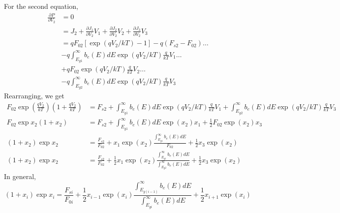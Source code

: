 \documentclass[12pt]{article}
\begin{document}
For the second equation, 
\begin{equation}
\begin{aligned}
\frac{\partial P}{\partial V_2} &= 0 \\
&= J_2 + \frac{\partial J_1}{\partial V_2} V_1 + \frac{\partial J_2}{\partial V_2} V_2 + \frac{\partial J_3}{\partial V_2} V_3 \\
&= q F_{02} \left [ \exp (q V_2/ k T) - 1 \right ] - q (F_{s2} - F_{02})  \ldots \\
&- q \int_{E_{g1}}^{\infty} b_e(E) dE \exp (q V_2/ k T) \frac{q}{k T} V_1 \ldots \\
&+  q F_{02} \exp (q V_2/ k T) \frac{q}{k T} V_2  \ldots \\
& -q  \int_{E_{g2}}^{\infty} b_e(E) dE \exp (q V_{2}/ k T) \frac{q}{k T} V_3  
\end{aligned}
\end{equation}
Rearranging, we get
\begin{equation}
\begin{aligned}
F_{02} \exp (\frac{ q V_2}{ k T} ) \left ( 1 + \frac{ q V_2}{k T} \right ) & = F_{s2} + 
\int_{E_{g1}}^{\infty} b_e(E) dE \exp (q V_2/ k T) \frac{q}{k T} V_1 + 
\int_{E_{g2}}^{\infty} b_e(E) dE \exp (q V_{2}/ k T) \frac{q}{k T} V_3 \\
F_{02} \exp x_2 \left ( 1 + x_2 \right ) & = F_{s2} + 
\int_{E_{g1}}^{\infty} b_e(E) dE \exp (x_2) x_1 + 
\frac{1}{2} F_{02} \exp (x_2) x_3  \\
\left ( 1 + x_2 \right )  \exp x_2  & = \frac{F_{s2}}{F_{02}} + 
x_1 \exp (x_2)  \frac{\int_{E_{g1}}^{\infty} b_e(E) dE}{F_{02}}   + 
\frac{1}{2} x_3 \exp (x_2)   \\
\left ( 1 + x_2 \right )  \exp x_2  & = \frac{F_{s2}}{F_{02}} + 
\frac{1}{2} x_1 \exp (x_2)  \frac{\int_{E_{g1}}^{\infty} b_e(E) dE}{\int_{E_{g2}}^{\infty} b_e(E) dE}   + 
\frac{1}{2} x_3 \exp (x_2)  
\end{aligned}
\end{equation}
In general, 
\begin{equation}
\left ( 1 + x_i \right )  \exp x_i   = \frac{F_{si}}{F_{0i}} + 
\frac{1}{2} x_{i-1} \exp (x_i)  \frac{\int_{E_{g(i-1)}}^{\infty} b_e(E) dE}{\int_{E_{gi}}^{\infty} b_e(E) dE}   + 
\frac{1}{2} x_{i+1} \exp (x_i)  
\end{equation}
\end{document}
